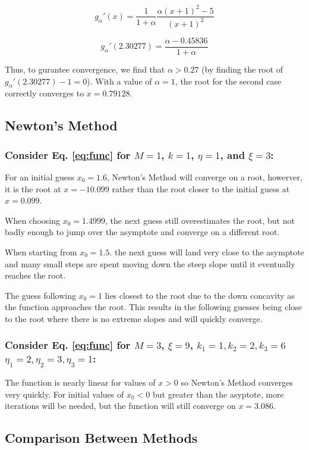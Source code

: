 \documentclass[12pt]{article}
\begin{document}
  $$g_\alpha'(x) = \frac{1}{1+\alpha}\frac{\alpha(x+1)^2-5}{(x+1)^2} $$

  $$g_\alpha'(2.30277) = \frac{\alpha - 0.45836}{1+\alpha} $$

  Thus, to gurantee convergence, we find that $\alpha > 0.27$ (by finding the
  root of $g_\alpha'(2.30277)-1=0$).
  With a value of $\alpha=1$, the root for the second case correctly converges
  to $x=0.79128$.

  \subsection*{Newton's Method}
  \subsubsection*{Consider Eq. \ref{eq:func} for $M=1$, $k=1$, $\eta=1$, and $\xi=3$:}

  For an initial guess $x_0=1.6$, Newton's Method will converge on a root,
  howerver, it is the root at $x=-10.099$ rather than the root closer to the
  initial guess at $x=0.099$.

  When choosing $x_0=1.4999$, the next guess still overestimates the root, but
  not badly enough to jump over the asymptote and converge on a different root.

  When starting from $x_0=1.5$. the next guess will land very close to the
  asymptote and many small steps are spent moving down the steep slope until
  it eventually reaches the root.
  
  The guess following $x_0=1$ lies closest to the root due to the down
  concavity as the function approaches the root. This results in the following
  guesses being close to the root where there is no extreme slopes and will
  quickly converge.

  \subsubsection*{Consider Eq. \ref{eq:func} for $M=3$, $\xi=9$, $k_1=1, k_2=2, k_3=6$
  $\eta_1=2, \eta_2=3, \eta_3=1$:}

  The function is nearly linear for values of $x > 0$ so Newton's Method
  converges very quickly. For initial values of $x_0 < 0$ but greater than 
  the asyptote, more iterations will be needed, but the function will still
  converge on $x=3.086$.

  \subsection*{Comparison Between Methods}
\end{document}
